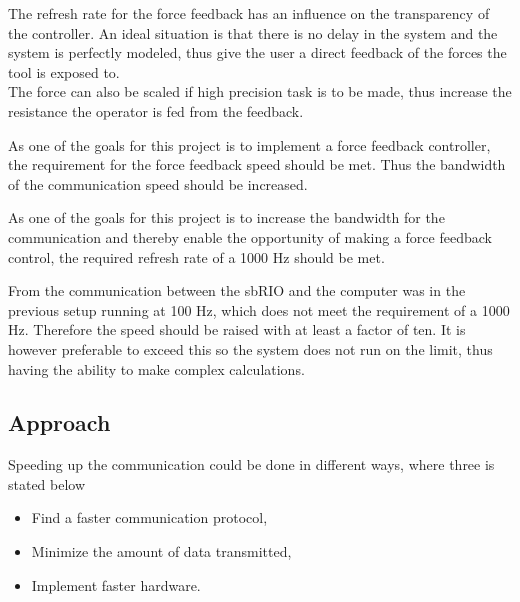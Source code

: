 
The refresh rate for the force feedback has an influence on the transparency of the controller. An ideal situation is that there is no delay in the system and the system is perfectly modeled, thus give the user a direct feedback of the forces the tool is exposed to.\\ 
The force can also be scaled if high precision task is to be made, thus increase the resistance the operator is fed from the feedback.

{\color{green}
As one of the goals for this project is to implement a force feedback controller, the requirement for the force feedback speed should be met. Thus the bandwidth of the communication speed should be increased.
} 

{\color{red} 
As one of the goals for this project is to increase the bandwidth for the communication and thereby enable the opportunity of making a force feedback control, the required refresh rate of a 1000 Hz should be met.
}

From  the communication between the sbRIO and the computer was in the previous setup running at 100 Hz, which does not meet the requirement of a 1000 Hz. Therefore the speed should be raised with at least a factor of ten. It is however preferable to exceed this so the system does not run on the limit, thus having the ability to make complex calculations.


\subsection*{Approach}
Speeding up the communication could be done in different ways, where three is stated below

\begin{itemize}
	\item Find a faster communication protocol,
	\item Minimize the amount of data transmitted,
	\item Implement faster hardware.	
\end{itemize}

